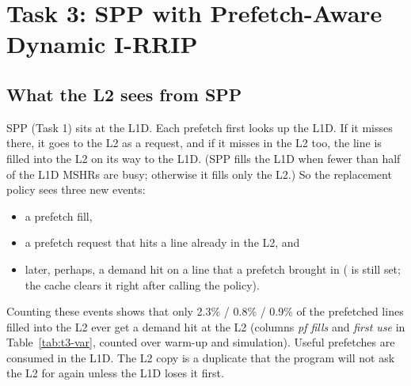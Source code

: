 \clearpage
\section{Task 3: SPP with Prefetch-Aware Dynamic I-RRIP}

\subsection{What the L2 sees from SPP}
SPP (Task 1) sits at the L1D. Each prefetch first looks up the L1D. If it misses there, it goes to the L2 as a
 request, and if it misses in the L2 too, the line is filled into the L2 on its way to the L1D.
(SPP fills the L1D when fewer than half of the L1D MSHRs are busy; otherwise it fills only the L2.) So the replacement
policy sees three new events:
\begin{itemize}
  \item a prefetch fill,
  \item a prefetch request that hits a line already in the L2, and
  \item later, perhaps, a demand hit on a line that a prefetch brought in ( is still set; the
        cache clears it right after calling the policy).
\end{itemize}
Counting these events shows that only 2.3\% / 0.8\% / 0.9\% of the prefetched lines filled into the L2 ever get a
demand hit at the L2 (columns \emph{pf fills} and \emph{first use} in Table~\ref{tab:t3-var}, counted over warm-up and
simulation). Useful prefetches are consumed in the L1D. The L2 copy is a duplicate that the program will not ask the L2
for again unless the L1D loses it first.

